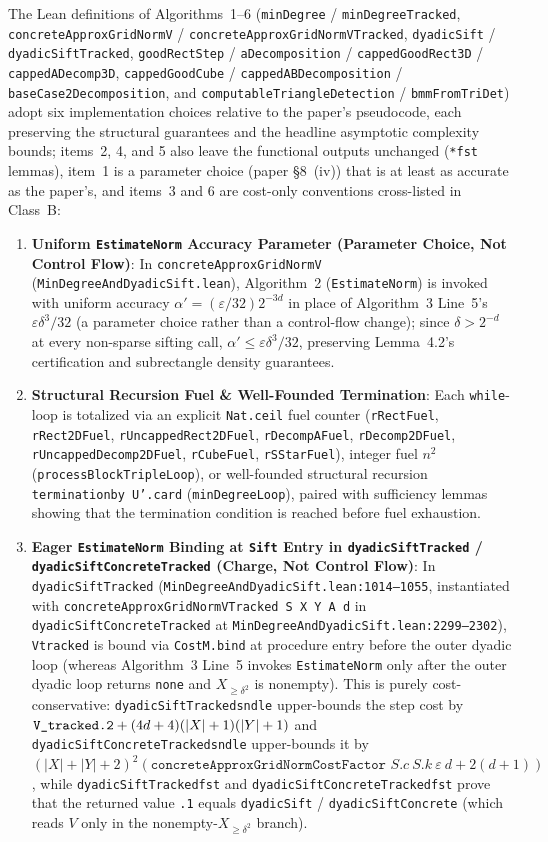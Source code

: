 \documentclass[10pt,letterpaper]{article}
\renewcommand{\_}{\origunderscore\allowbreak}
\newcommand{\code}[1]{\texttt{#1}}
\begin{document}
The Lean definitions of Algorithms~1--6 (\code{minDegree} / \code{minDegreeTracked}, \code{concreteApproxGridNormV} / \code{concreteApproxGridNormVTracked}, \code{dyadicSift} / \code{dyadicSiftTracked}, \code{goodRectStep} / \code{aDecomposition} / \code{cappedGoodRect3D} / \code{cappedADecomp3D}, \code{cappedGoodCube} / \code{cappedABDecomposition} / \code{baseCase2Decomposition}, and \code{computableTriangleDetection} / \code{bmmFromTriDet}) adopt six implementation choices relative to the paper's pseudocode, each preserving the structural guarantees and the headline asymptotic complexity bounds; items~2, 4, and 5 also leave the functional outputs unchanged (\code{*\_fst} lemmas), item~1 is a parameter choice (paper \S 8~(iv)) that is at least as accurate as the paper's, and items~3 and 6 are cost-only conventions cross-listed in Class~B:
\begin{enumerate}
  \item \textbf{Uniform \code{EstimateNorm} Accuracy Parameter (Parameter Choice, Not Control Flow)}: In \code{concreteApproxGridNormV} (\code{MinDegreeAndDyadicSift.lean}), Algorithm~2 (\code{EstimateNorm}) is invoked with uniform accuracy $\alpha' = (\varepsilon/32)2^{-3d}$ in place of Algorithm~3 Line~5's $\varepsilon\delta^3/32$ (a parameter choice rather than a control-flow change); since $\delta > 2^{-d}$ at every non-sparse sifting call, $\alpha' \le \varepsilon\delta^3/32$, preserving Lemma~4.2's certification and subrectangle density guarantees.
  \item \textbf{Structural Recursion Fuel \& Well-Founded Termination}: Each \code{while}-loop is totalized via an explicit \code{Nat.ceil} fuel counter (\code{rRectFuel}, \code{rRect2DFuel}, \code{rUncappedRect2DFuel}, \code{rDecompAFuel}, \code{rDecomp2DFuel}, \code{rUncappedDecomp2DFuel}, \code{rCubeFuel}, \code{rSStarFuel}), integer fuel $n^2$ (\code{processBlockTripleLoop}), or well-founded structural recursion \code{termination\_by U'.card} (\code{minDegreeLoop}), paired with sufficiency lemmas showing that the termination condition is reached before fuel exhaustion.
  \item \textbf{Eager \code{EstimateNorm} Binding at \code{Sift} Entry in \code{dyadicSiftTracked} / \code{dyadicSiftConcreteTracked} (Charge, Not Control Flow)}: In \code{dyadicSiftTracked} (\code{MinDegreeAndDyadicSift.lean:1014--1055}, instantiated with \code{concreteApproxGridNormVTracked S X Y A d} in \code{dyadicSiftConcreteTracked} at \code{MinDegreeAndDyadicSift.lean:2299--2302}), \code{V\_tracked} is bound via \code{CostM.bind} at procedure entry before the outer dyadic loop (whereas Algorithm~3 Line~5 invokes \code{EstimateNorm} only after the outer dyadic loop returns \code{none} and $X_{\ge \delta^2}$ is nonempty). This is purely cost-conservative: \code{dyadicSiftTracked\_snd\_le} upper-bounds the step cost by $\code{V\_tracked.2} + (4d + 4)(|X| + 1)(|Y| + 1)$ and \code{dyadicSiftConcreteTracked\_snd\_le} upper-bounds it by $(|X| + |Y| + 2)^2 (\code{concreteApproxGridNormCostFactor }S.c\ S.k\ \varepsilon\ d + 2(d + 1))$, while \code{dyadicSiftTracked\_fst} and \code{dyadicSiftConcreteTracked\_fst} prove that the returned value \code{.1} equals \code{dyadicSift} / \code{dyadicSiftConcrete} (which reads $V$ only in the nonempty-$X_{\ge \delta^2}$ branch).

\end{enumerate}
\end{document}
